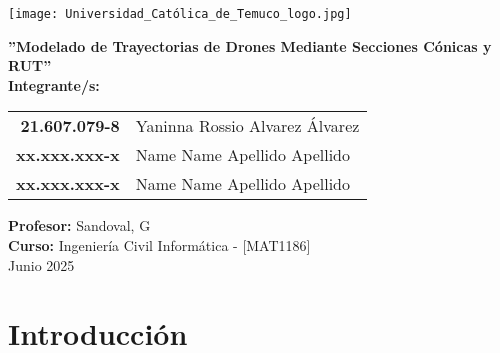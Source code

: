 \documentclass[letterpaper,12pt]{article}
\begin{document}
\begin{titlepage}
    \centering
    \vspace*{\fill}
    \texttt{[image: Universidad\_Católica\_de\_Temuco\_logo.jpg]}
    \vspace{1cm}
    
    \Large
    \textbf{”Modelado de Trayectorias de Drones Mediante Secciones Cónicas y RUT”}\\[1cm]
    
    \large
    \textbf{Integrante/s:}\\[0.3cm]
    
    \begin{center}
    \begin{tabular}{rl}
        \textbf{21.607.079-8} & Yaninna Rossio Alvarez Álvarez \\
        \textbf{xx.xxx.xxx-x} & Name Name Apellido Apellido \\
        \textbf{xx.xxx.xxx-x} & Name Name Apellido Apellido \\
    \end{tabular}
    \end{center}
    
    \vspace{0.5cm}
    \textbf{Profesor:} Sandoval, G\\
    \textbf{Curso:} Ingeniería Civil Informática - [MAT1186]\\
    
    \vspace{0.5cm}
    \normalsize
    Junio 2025
    \vspace*{\fill}
\end{titlepage}

\section{Introducción}
\end{document}
